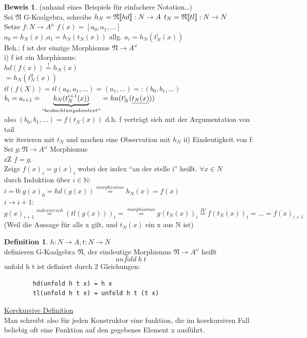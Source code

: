 \documentclass{article}
\theoremstyle{definition}
\newtheorem{beweis}{Beweis}[section]
\newtheorem{definition}{Definition}[section]
\begin{document}
	\begin{beweis}(anhand eines Beispiels für einfachere Notation\dots)\\
	Sei $\mathfrak{N}$ G-Koalgebra, schreibe $h_N = \mathfrak{N}\llbracket hd\rrbracket:N\to A$ $t_N = \mathfrak{N}\llbracket tl\rrbracket:N\to N$\\
	Setze $f:N\to A^\omega$ $f(x) = [a_0,a_1,\dots]$\\
	$a_0 = h_N(x)$,$a_1 = h_N(t_N(x))$ allg. $a_i = h_N(t^i_N(x))$\\
	Beh.: f ist der einzige Morphismus $\mathfrak{N}\to A^\omega$\\
	i) f ist ein Morphismus:\\
	$hd(f(x))\stackrel{!}{=}h_N(x)$\\
	$=h_N(t_N^0(x))$\\
	$tl(f(X)) = tl(a_0,a_1,\dots) = (a_1,\dots) =: (b_0,b_1,\dots)$\\
	$b_i=a_{i+1} = \underbrace{h_N (t_N^{i+1}(x))}_{``beobachtungskontext''} = hn(t_N^i(\underline{t_N(x)}))$\\
	also $(b_0,b_1,\dots) = f(t_N(x))$ d.h. f verträgt sich mit der Argumentation von tail\\
	wir iterieren mit $t_N$ und machen eine Observation mit $h_N$
	ii) Eindeutigkeit von f: Sei $g:\mathfrak{N}\to A^\omega$ Morphismus\\
	zZ $f=g$.\\
	Zeige $f(x)_i = g(x)_i$ wobei der index ``an der stelle i'' heißt. $\forall x\in N$\\
	durch Induktion über $i\in \mathbb{N}$:\\
	$i=0: g(x)_0 = hd(g(x)) \stackrel{morphismus}{=} h_N(x)=f(x) $\\
	$i\to i+1$: $g(x)_{i+1} \stackrel{indexversch}{=} (tl (g(x)))_i = \stackrel{morphismus}{=} g(t_N(x))_i \stackrel{IV}{=} f(t_N(x))_i = \dots =f(x)_{i+1}$ (Weil die Aussage für alle x gilt, und $t_N(x)$ ein x aus N ist)\\
	\end{beweis}
	\begin{definition} $h:N\to A, t:N\to N$\\
	definieren G-Koalgebra $\mathfrak{N}$, der eindeutige Morphismus $\mathfrak{N}\to A^\omega$ heißt
	 \[unfold\ h\ t\]
	unfold  h t ist definiert durch 2 Gleichungen:\\
	\begin{verbatim}
		hd(unfold h t x) = h x
		tl(unfold h t x) = unfold h t (t x)
	\end{verbatim}
	\underline{Korekursive Definition}\\
	Man schreibt also für jeden Konstruktor eine funktion, die im korekursiven Fall beliebig oft eine Funktion auf den gegebenes Element x ausführt.\\
	\end{definition}
\end{document}
